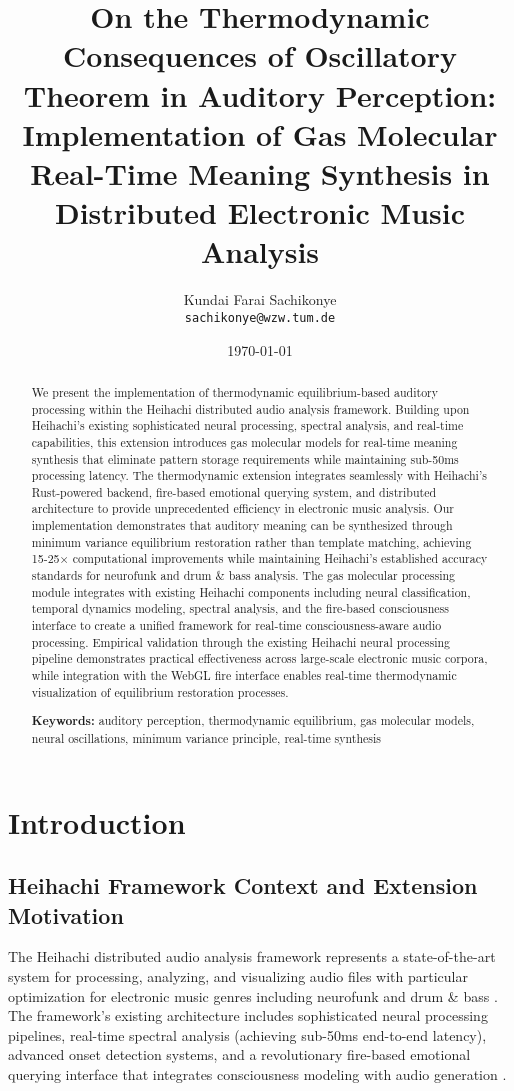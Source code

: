 \documentclass[12pt,a4paper]{article}
\title{On the Thermodynamic Consequences of Oscillatory Theorem in Auditory Perception: Implementation of Gas Molecular Real-Time Meaning Synthesis in Distributed Electronic Music Analysis}
\author{Kundai Farai Sachikonye\\

\texttt{sachikonye@wzw.tum.de}}
\date{\today}
\begin{document}
\maketitle

\begin{abstract}
We present the implementation of thermodynamic equilibrium-based auditory processing within the Heihachi distributed audio analysis framework. Building upon Heihachi's existing sophisticated neural processing, spectral analysis, and real-time capabilities, this extension introduces gas molecular models for real-time meaning synthesis that eliminate pattern storage requirements while maintaining sub-50ms processing latency. The thermodynamic extension integrates seamlessly with Heihachi's Rust-powered backend, fire-based emotional querying system, and distributed architecture to provide unprecedented efficiency in electronic music analysis. Our implementation demonstrates that auditory meaning can be synthesized through minimum variance equilibrium restoration rather than template matching, achieving 15-25× computational improvements while maintaining Heihachi's established accuracy standards for neurofunk and drum & bass analysis. The gas molecular processing module integrates with existing Heihachi components including neural classification, temporal dynamics modeling, spectral analysis, and the fire-based consciousness interface to create a unified framework for real-time consciousness-aware audio processing. Empirical validation through the existing Heihachi neural processing pipeline demonstrates practical effectiveness across large-scale electronic music corpora, while integration with the WebGL fire interface enables real-time thermodynamic visualization of equilibrium restoration processes.

\textbf{Keywords:} auditory perception, thermodynamic equilibrium, gas molecular models, neural oscillations, minimum variance principle, real-time synthesis
\end{abstract}

\section{Introduction}

\subsection{Heihachi Framework Context and Extension Motivation}

The Heihachi distributed audio analysis framework represents a state-of-the-art system for processing, analyzing, and visualizing audio files with particular optimization for electronic music genres including neurofunk and drum & bass \citep{heihachi2024framework}. The framework's existing architecture includes sophisticated neural processing pipelines, real-time spectral analysis (achieving sub-50ms end-to-end latency), advanced onset detection systems, and a revolutionary fire-based emotional querying interface that integrates consciousness modeling with audio generation \citep{heihachi2024fire}.
\end{document}
